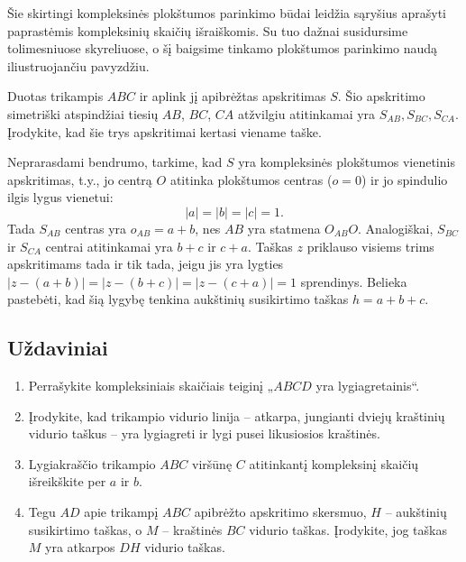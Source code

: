 \documentclass[11pt,a4paper,twoside]{book}
\begin{document}
Šie skirtingi kompleksinės plokštumos parinkimo būdai leidžia sąryšius aprašyti
paprastėmis kompleksinių skaičių išraiškomis. Su tuo dažnai susidursime
tolimesniuose skyreliuose, o šį baigsime tinkamo plokštumos parinkimo naudą
iliustruojančiu pavyzdžiu.

\begin{pav}
Duotas trikampis $ABC$ ir aplink jį apibrėžtas apskritimas $S$. Šio apskritimo simetriški atspindžiai tiesių $AB$, $BC$, $CA$ atžvilgiu atitinkamai yra $S_{AB}, S_{BC}, S_{CA}$. Įrodykite, kad šie trys apskritimai kertasi viename taške.
\end{pav}

\begin{sprendimas}
  Neprarasdami bendrumo, tarkime, kad $S$ yra kompleksinės plokštumos vienetinis
  apskritimas, t.y., jo centrą $O$ atitinka plokštumos centras ($o=0$) ir jo
  spindulio ilgis lygus vienetui: 
  $$
  |a|=|b|=|c|=1.
  $$
  Tada $S_{AB}$ centras yra $o_{AB}=a+b$, nes $AB$ yra statmena $O_{AB}O$.
  Analogiškai, $S_{BC}$ ir $S_{CA}$ centrai atitinkamai yra $b+c$ ir $c+a$.
  Taškas $z$ priklauso visiems trims apskritimams tada ir tik tada, jeigu jis
  yra lygties $|z-(a+b)|=|z-(b+c)|=|z-(c+a)|=1$ sprendinys. Belieka pastebėti,
  kad šią lygybę tenkina aukštinių susikirtimo taškas $h=a+b+c$.
\end{sprendimas}

\subsection{Uždaviniai}

\begin{enumerate}
  \item Perrašykite kompleksiniais skaičiais teiginį „$ABCD$ yra
    lygiagretainis“. 
  \item Įrodykite, kad trikampio vidurio linija -- atkarpa, jungianti dviejų
    kraštinių vidurio taškus -- yra lygiagreti ir lygi pusei likusiosios
    kraštinės.
  \item Lygiakraščio trikampio $ABC$ viršūnę $C$ atitinkantį kompleksinį skaičių
    išreikškite per $a$ ir $b$.
  \item Tegu $AD$ apie trikampį $ABC$ apibrėžto apskritimo skersmuo, $H$ --
    aukštinių susikirtimo taškas, o $M$ -- kraštinės $BC$ vidurio taškas.
    Įrodykite, jog taškas $M$ yra atkarpos $DH$ vidurio taškas.
\end{enumerate}
\end{document}
